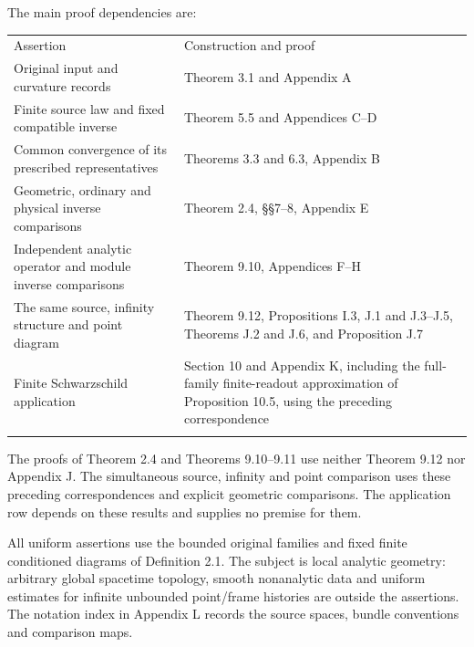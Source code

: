 \documentclass[
  english,
  11pt,
  reqno]{amsart}
\newcounter{none} %
\begin{document}
The main proof dependencies are:

{\def\LTcaptype{none} %
\begin{longtable}[]{@{}
  >{\raggedright\arraybackslash}p{}
  >{\raggedright\arraybackslash}p{}@{}}
\toprule\noalign{}
\begin{minipage}[b]{\linewidth}\raggedright
Assertion
\end{minipage} & \begin{minipage}[b]{\linewidth}\raggedright
Construction and proof
\end{minipage} \\*
\midrule\noalign{}
\endhead
\bottomrule\noalign{}
\endlastfoot
Original input and curvature records & Theorem 3.1 and Appendix A \\*
Finite source law and fixed compatible inverse & Theorem 5.5 and
Appendices C--D \\*
Common convergence of its prescribed representatives & Theorems 3.3 and
6.3, Appendix B \\*
Geometric, ordinary and physical inverse comparisons & Theorem 2.4,
§§7--8, Appendix E \\*
Independent analytic operator and module inverse comparisons & Theorem
9.10, Appendices F--H \\*
The same source, infinity structure and point diagram & Theorem 9.12,
Propositions I.3, J.1 and J.3--J.5, Theorems J.2 and J.6, and
Proposition J.7 \\*
Finite Schwarzschild application & Section 10 and Appendix K, including
the full-family finite-readout approximation of Proposition 10.5, using
the preceding correspondence \\*
\end{longtable}
}

The proofs of Theorem 2.4 and Theorems 9.10--9.11 use neither Theorem
9.12 nor Appendix J. The simultaneous source, infinity and point
comparison uses these preceding correspondences and explicit geometric
comparisons. The application row depends on these results and supplies
no premise for them.

All uniform assertions use the bounded original families and fixed
finite conditioned diagrams of Definition 2.1. The subject is local
analytic geometry: arbitrary global spacetime topology, smooth
nonanalytic data and uniform estimates for infinite unbounded
point/frame histories are outside the assertions. The notation index in
Appendix L records the source spaces, bundle conventions and comparison
maps.
\end{document}
